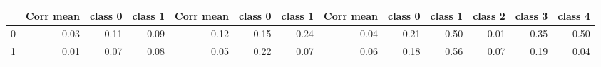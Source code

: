 \begin{tabular}{lrrrrrrrrrrrr}
\toprule
{} &  Corr mean &  class 0 &  class 1 &  Corr mean &  class 0 &  class 1 &  Corr mean &  class 0 &  class 1 &  class 2 &  class 3 &  class 4 \\
\midrule
0 &       0.03 &     0.11 &     0.09 &       0.12 &     0.15 &     0.24 &       0.04 &     0.21 &     0.50 &    -0.01 &     0.35 &     0.50 \\
1 &       0.01 &     0.07 &     0.08 &       0.05 &     0.22 &     0.07 &       0.06 &     0.18 &     0.56 &     0.07 &     0.19 &     0.04 \\
\bottomrule
\end{tabular}
